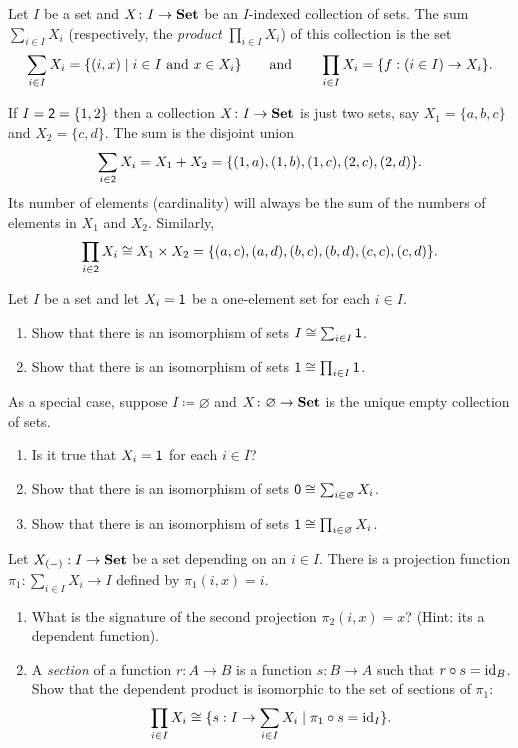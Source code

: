 \documentclass[DynamicalBook]{subfiles}
\begin{document}
\begin{definition}
Let $I$ be a set and $X\colon I\to\textbf{Set}$ be an $I$-indexed collection of sets. The sum $\sum_{i\in I}X_i$ (respectively, the \emph{product} $\prod_{i\in I}X_i$) of this collection is the set
\[
\sum_{i\in I}X_i=\{(i,x)\mid i\in I\text{ and }x\in X_i\}
\qquad\text{and}\qquad
\prod_{i\in I}X_i=\{f : (i \in I) \to X_i\}.
\]
\end{definition}

\begin{example}\label{ex.two_sums_and_prods}
If $I=\textsf{2}=\{1,2\}$ then a collection $X\colon I\to \textbf{Set}$ is just two sets, say $X_1=\{a,b,c\}$ and $X_2=\{c,d\}$. The sum is the disjoint union
\[\sum_{i\in \textsf{2}}X_i=X_1+X_2=\{(1,a),(1,b),(1,c),(2,c),(2,d)\}.\]
Its number of elements (cardinality) will always be the sum of the numbers of elements in $X_1$ and $X_2$. Similarly,
\[\prod_{i\in \textsf{2}}X_i \cong X_1\times X_2=\{(a,c),(a,d),(b,c),(b,d),(c,c),(c,d)\}.\]
\end{example}


\begin{exercise}\label{exc.on_sums_prods_sets}
Let $I$ be a set and let $X_i=\textsf{1}$ be a one-element set for each $i\in I$. 
\begin{enumerate}
	\item Show that there is an isomorphism of sets $I\cong\sum_{i\in I}\textsf{1}$.
	\item Show that there is an isomorphism of sets $\textsf{1}\cong\prod_{i\in I}\textsf{1}$.
\end{enumerate}
As a special case, suppose $I\coloneqq\varnothing$ and $X\colon \varnothing\to\textbf{Set}$ is the unique empty collection of sets.
\begin{enumerate}
	\item Is it true that $X_i=\textsf{1}$ for each $i\in I$?
	\item Show that there is an isomorphism of sets $\textsf{0}\cong\sum_{i\in\varnothing}X_i$.
	\item Show that there is an isomorphism of sets $\textsf{1}\cong\prod_{i\in\varnothing}X_i$.
\qedhere
\end{enumerate}
\end{exercise}

\begin{exercise}\label{ex.dependent_product_as_sections}
  Let $X_{(-)} : I \to \textbf{Set}$ be a set depending on an $i \in I$. There is a
  projection function
  $\pi_1 : \sum_{i \in I} X_i \to I$
  defined by $\pi_1(i, x) = i$.
  \begin{enumerate}
    \item What is the signature of the second projection $\pi_2(i, x) = x$?
      (Hint: its a dependent function).
    \item A \emph{section} of a function $r : A \to B$ is a function $s : B \to
      A$ such that $r \circ s = \mathrm{id}_B$. Show that the dependent product is
      isomorphic to the set of sections of $\pi_1$:
      $$\prod_{i \in I} X_i \cong \{s : I \to \sum_{i \in I} X_i \mid \pi_1
      \circ s = \mathrm{id}_I\}.$$
  \end{enumerate}
\end{exercise}
\end{document}
